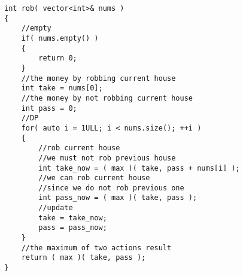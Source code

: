 \setcounter{lstlisting}{0}
\begin{lstlisting}[style=customc, caption={Dynamic Programming}]
int rob( vector<int>& nums )
{
    //empty
    if( nums.empty() )
    {
        return 0;
    }
    //the money by robbing current house
    int take = nums[0];
    //the money by not robbing current house
    int pass = 0;
    //DP
    for( auto i = 1ULL; i < nums.size(); ++i )
    {
        //rob current house
        //we must not rob previous house
        int take_now = ( max )( take, pass + nums[i] );
        //we can rob current house
        //since we do not rob previous one
        int pass_now = ( max )( take, pass );
        //update
        take = take_now;
        pass = pass_now;
    }
    //the maximum of two actions result
    return ( max )( take, pass );
}
\end{lstlisting} 
